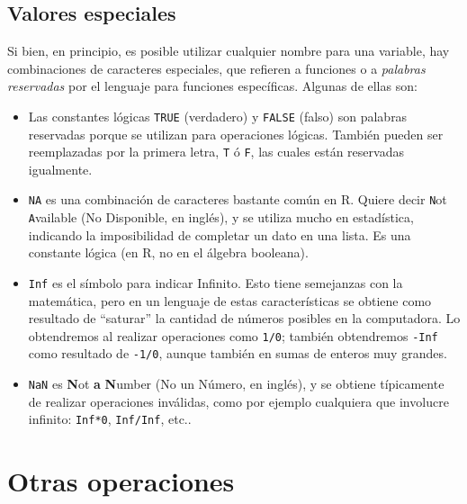 \documentclass[11pt,a4paper]{article}
\begin{document}
\subsection{Valores especiales}

Si bien, en principio, es posible utilizar cualquier nombre para una variable, hay combinaciones de caracteres especiales, que refieren a funciones o a \textit{palabras reservadas} por el lenguaje para funciones específicas. Algunas de ellas son:

\begin{itemize}
\item[$\bullet$] Las constantes lógicas \texttt{TRUE} (verdadero) y \texttt{FALSE} (falso) son palabras reservadas porque se utilizan para operaciones lógicas. También pueden ser reemplazadas por la primera letra, \texttt{T} ó \texttt{F}, las cuales están reservadas igualmente.

\item[$\bullet$] \texttt{NA} es una combinación de caracteres bastante común en R. Quiere decir \texttt{N}ot \texttt{A}vailable (No Disponible, en inglés), y se utiliza mucho en estadística, indicando la imposibilidad de completar un dato en una lista. Es una constante lógica (en R, no en el álgebra booleana).

\item[$\bullet$] \texttt{Inf} es el símbolo para indicar Infinito. Esto tiene semejanzas con la matemática, pero en un lenguaje de estas características se obtiene como resultado de ``saturar'' la cantidad de números posibles en la computadora. Lo obtendremos al realizar operaciones como \texttt{1/0}; también obtendremos \texttt{-Inf} como resultado de \texttt{-1/0}, aunque también en sumas de enteros muy grandes.
 
\item[$\bullet$] \texttt{NaN} es \textbf{N}ot \textbf{a} \textbf{N}umber (No un Número, en inglés), y se obtiene típicamente de realizar operaciones inválidas, como por ejemplo cualquiera que involucre infinito: \texttt{Inf*0}, \texttt{Inf/Inf}, etc..
\end{itemize}


\section{Otras operaciones}
\end{document}

